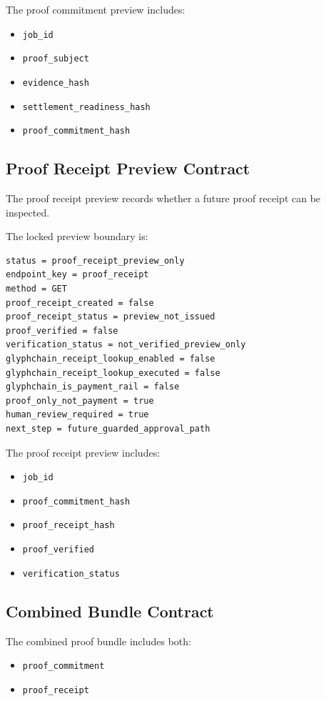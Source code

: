 The proof commitment preview includes:

\begin{itemize}
  \item \texttt{job\_id}
  \item \texttt{proof\_subject}
  \item \texttt{evidence\_hash}
  \item \texttt{settlement\_readiness\_hash}
  \item \texttt{proof\_commitment\_hash}
\end{itemize}

\subsection{Proof Receipt Preview Contract}

The proof receipt preview records whether a future proof receipt can be inspected.

The locked preview boundary is:

\begin{verbatim}
status = proof_receipt_preview_only
endpoint_key = proof_receipt
method = GET
proof_receipt_created = false
proof_receipt_status = preview_not_issued
proof_verified = false
verification_status = not_verified_preview_only
glyphchain_receipt_lookup_enabled = false
glyphchain_receipt_lookup_executed = false
glyphchain_is_payment_rail = false
proof_only_not_payment = true
human_review_required = true
next_step = future_guarded_approval_path
\end{verbatim}

The proof receipt preview includes:

\begin{itemize}
  \item \texttt{job\_id}
  \item \texttt{proof\_commitment\_hash}
  \item \texttt{proof\_receipt\_hash}
  \item \texttt{proof\_verified}
  \item \texttt{verification\_status}
\end{itemize}

\subsection{Combined Bundle Contract}

The combined proof bundle includes both:

\begin{itemize}
  \item \texttt{proof\_commitment}
  \item \texttt{proof\_receipt}
\end{itemize}

